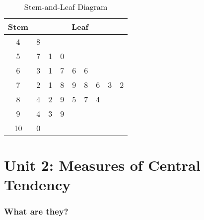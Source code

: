\documentclass[
10pt, %
a4paper, %
]{report}
\begin{document}
\begin{table}[H]
\begin{center}
\begin{tabular}{|c|cccccccc|}
\hline
Stem &
  \multicolumn{8}{c|}{Leaf} \\ \hline
4 &
  \multicolumn{1}{c|}{8} &
  \multicolumn{1}{c|}{} &
  \multicolumn{1}{c|}{} &
  \multicolumn{1}{c|}{} &
  \multicolumn{1}{c|}{} &
  \multicolumn{1}{c|}{} &
  \multicolumn{1}{c|}{} &
   \\ \hline
5 &
  \multicolumn{1}{c|}{7} &
  \multicolumn{1}{c|}{1} &
  \multicolumn{1}{c|}{0} &
  \multicolumn{1}{c|}{} &
  \multicolumn{1}{c|}{} &
  \multicolumn{1}{c|}{} &
  \multicolumn{1}{c|}{} &
   \\ \hline
6 &
  \multicolumn{1}{c|}{3} &
  \multicolumn{1}{c|}{1} &
  \multicolumn{1}{c|}{7} &
  \multicolumn{1}{c|}{6} &
  \multicolumn{1}{c|}{6} &
  \multicolumn{1}{c|}{} &
  \multicolumn{1}{c|}{} &
   \\ \hline
7 &
  \multicolumn{1}{c|}{2} &
  \multicolumn{1}{c|}{1} &
  \multicolumn{1}{c|}{8} &
  \multicolumn{1}{c|}{9} &
  \multicolumn{1}{c|}{8} &
  \multicolumn{1}{c|}{6} &
  \multicolumn{1}{c|}{3} &
  2 \\ \hline
8 &
  \multicolumn{1}{c|}{4} &
  \multicolumn{1}{c|}{2} &
  \multicolumn{1}{c|}{9} &
  \multicolumn{1}{c|}{5} &
  \multicolumn{1}{c|}{7} &
  \multicolumn{1}{c|}{4} &
  \multicolumn{1}{c|}{} &
   \\ \hline
9 &
  \multicolumn{1}{c|}{4} &
  \multicolumn{1}{c|}{3} &
  \multicolumn{1}{c|}{9} &
  \multicolumn{1}{c|}{} &
  \multicolumn{1}{c|}{} &
  \multicolumn{1}{c|}{} &
  \multicolumn{1}{c|}{} &
   \\ \hline
10 &
  \multicolumn{1}{c|}{0} &
  \multicolumn{1}{c|}{} &
  \multicolumn{1}{c|}{} &
  \multicolumn{1}{c|}{} &
  \multicolumn{1}{c|}{} &
  \multicolumn{1}{c|}{} &
  \multicolumn{1}{c|}{} &
   \\ \hline
\end{tabular}
\end{center}
\caption{Stem-and-Leaf Diagram}
\label{fig:stemleaf}
\end{table}






\chapter*{Unit 2: Measures of Central Tendency}
\subsection*{What are they?}
\end{document}
